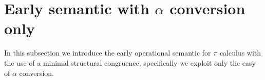 %     
% 
% 
% 
% 
% 

\section{Early semantic with $\alpha$ conversion only}
In this subsection we introduce the early operational semantic for $\pi$ calculus with the use of a minimal structural congruence, specifically we exploit only the easy of $\alpha$ conversion.

